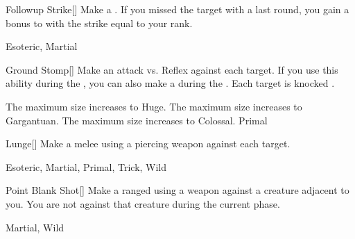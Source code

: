 \lowercase{\hypertarget{maneuver:Followup Strike}{}}\label{maneuver:Followup Strike}
\hypertarget{maneuver:Followup Strike}{}
\begin{freeability}[Rank 2]{Followup Strike}[]
Make a .
If you missed the target with a  last round, you gain a bonus to  with the strike equal to your rank.


 Esoteric, Martial
\end{freeability}
\vspace{0.25em}



\lowercase{\hypertarget{maneuver:Ground Stomp}{}}\label{maneuver:Ground Stomp}
\hypertarget{maneuver:Ground Stomp}{}
\begin{freeability}[Rank 2]{Ground Stomp}[]
Make an attack vs. Reflex against each target.
If you use this ability during the , you can also make a  during the .
\hit Each target is knocked \prone.

\rankline
{} The maximum size increases to Huge.
 The maximum size increases to Gargantuan.
 The maximum size increases to Colossal.
 Primal
\end{freeability}
\vspace{0.25em}



\lowercase{\hypertarget{maneuver:Lunge}{}}\label{maneuver:Lunge}
\hypertarget{maneuver:Lunge}{}
\begin{freeability}[Rank 2]{Lunge}[]
Make a melee  using a piercing weapon against each target.


 Esoteric, Martial, Primal, Trick, Wild
\end{freeability}
\vspace{0.25em}



\lowercase{\hypertarget{maneuver:Point Blank Shot}{}}\label{maneuver:Point Blank Shot}
\hypertarget{maneuver:Point Blank Shot}{}
\begin{freeability}[Rank 2]{Point Blank Shot}[]
Make a ranged  using a  weapon against a creature adjacent to you.
You are not  against that creature during the current phase.


 Martial, Wild
\end{freeability}
\vspace{0.25em}



